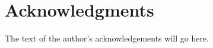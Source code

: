 \cleardoublepage
\chapter*{Acknowledgments}

\noindent The text of the author's acknowledgements will go here. 